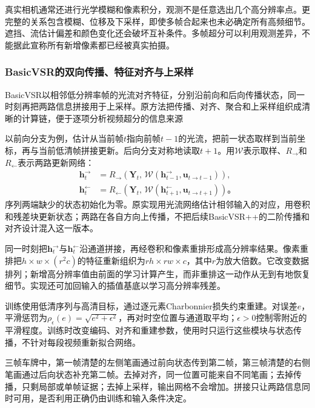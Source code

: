 真实相机通常还进行光学模糊和像素积分，观测不是任意选出几个高分辨率点。更完整的关系包含模糊、位移及下采样，即使多帧合起来也未必确定所有高频细节。遮挡、流估计偏差和颜色变化还会破坏互补条件。多帧超分可以利用观测差异，不能据此宣称所有新增像素都已经被真实拍摄。

\subsubsection{BasicVSR的双向传播、特征对齐与上采样}
\label{sec:vision-video-basicvsr}

BasicVSR以相邻低分辨率帧的光流对齐特征，分别沿前向和后向传播状态，同一时刻再把两路信息拼接用于上采样。原方法把传播、对齐、聚合和上采样组织成清晰的计算链，便于逐项分析视频超分的信息来源

以前向分支为例，估计从当前帧$t$指向前帧$t-1$的光流，把前一状态取样到当前坐标，再与当前低清帧拼接更新。后向分支对称地读取$t+1$。用$\mathcal{W}$表示取样、$R_{\to}$和$R_{\leftarrow}$表示两路更新网络：
\begin{equation}
  \begin{aligned}
    \bm{h}^{\to}_t&=
      R_{\to}\!\left(\bm{Y}_t,\,
      \mathcal{W}(\bm{h}^{\to}_{t-1},\bm{u}_{t\to t-1})\right),\\
    \bm{h}^{\leftarrow}_t&=
      R_{\leftarrow}\!\left(\bm{Y}_t,\,
      \mathcal{W}(\bm{h}^{\leftarrow}_{t+1},\bm{u}_{t\to t+1})\right)\text{。}
  \end{aligned}
  \label{eq:vision-video-basicvsr}
\end{equation}
序列两端缺少的状态初始化为零。原实现用光流网络估计相邻输入的对应，用卷积和残差块更新状态；两路在各自方向上传播，不把后续BasicVSR++的二阶传播和对齐设计混入这一版本。

同一时刻把$\bm{h}^{\to}_t$与$\bm{h}^{\leftarrow}_t$沿通道拼接，再经卷积和像素重排形成高分辨率结果。像素重排把$h\times w\times(r^2c)$的特征重新组织为$rh\times rw\times c$，其中$r$为放大倍数。它改变数据排列；新增高分辨率值由前面的学习计算产生，而非重排这一动作从无到有地恢复细节。实现还可加回输入的插值基底以学习高分辨率残差。

训练使用低清序列与高清目标，通过逐元素Charbonnier损失约束重建。对误差$e$，平滑惩罚为$\rho_\epsilon(e)=\sqrt{e^2+\epsilon^2}$，再对时空位置与通道取平均；$\epsilon>0$控制零附近的平滑程度。训练时改变编码、对齐和重建参数，使用时只运行这些模块与状态传播，不针对每段视频重新拟合网络。

三帧车牌中，第一帧清楚的左侧笔画通过前向状态传到第二帧，第三帧清楚的右侧笔画通过后向状态补充第二帧。去掉对齐，同一位置可能来自不同笔画；去掉传播，只剩局部或单帧证据；去掉上采样，输出网格不会增加。拼接只让两路信息同时可用，是否利用正确仍由训练和输入条件决定。

